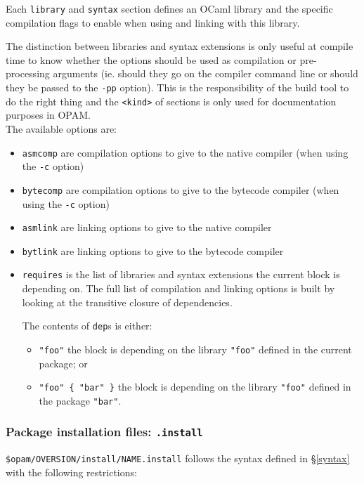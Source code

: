 \documentclass[a4paper,11pt]{article}
\begin{document}
Each {\tt library} and {\tt syntax} section defines an OCaml library
and the specific compilation flags to enable when using and linking
with this library.

The distinction between libraries and syntax extensions is only useful
at compile time to know whether the options should be used as
compilation or pre-processing arguments (ie. should they go on the
compiler command line or should they be passed to the {\tt -pp}
option). This is the responsibility of the build tool to do the right
thing and the {\tt <kind>} of sections is only used for documentation
purposes in OPAM. \\

The available options are:

\begin{itemize}
\item {\tt asmcomp} are compilation options to give to the native
  compiler (when using the {\tt -c} option)
\item {\tt bytecomp} are compilation options to give to the bytecode
  compiler (when using the {\tt -c} option)
\item {\tt asmlink} are linking options to give to the native compiler 
\item {\tt bytlink} are linking options to give to the bytecode
  compiler
\item {\tt requires} is the list of libraries and syntax extensions
  the current block is depending on. The full list of compilation
  and linking options is built by looking at the transitive closure of
  dependencies.

  The contents of {\tt dep}s is either:
  \begin{itemize}
  \item {\tt "foo"} the block is depending on the library {\tt "foo"}
    defined in the current package; or
  \item \verb+"foo" { "bar" }+ the block is depending on the
    library {\tt "foo"} defined in the package {\tt "bar"}.
  \end{itemize}
\end{itemize}

\subsubsection{Package installation files: {\tt .install}}
\label{dotinstall}

\verb+$opam/OVERSION/install/NAME.install+ follows the syntax defined
in \S\ref{syntax} with the following restrictions:
\end{document}

